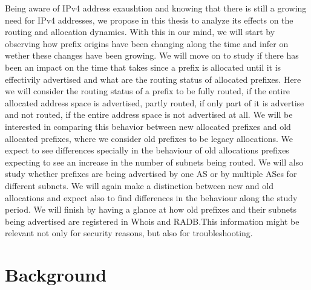 \documentclass[11pt,a4paper]{scrreprt}
\begin{document}
Being aware of IPv4 address exaushtion and knowing that there is still a growing need for IPv4 addresses, we propose in this thesis to analyze its effects on the routing and allocation dynamics. With this in our mind, we will start by observing how prefix origins have been changing along the time and infer on wether these changes have been growing. We will move on to study if there has been an impact on the time that takes since a prefix is allocated until it is effectivily advertised and what are the routing status of allocated prefixes. Here we will consider the routing status of a prefix to be fully routed, if the entire allocated address space is advertised, partly routed, if only part of it is advertise and not routed, if the entire address space is not advertised at all. We will be interested in comparing this behavior between new allocated prefixes and old allocated prefixes, where we consider old prefixes to be legacy allocations. We expect to see differences specially in the behaviour of old allocations prefixes expecting to see an increase in the number of subnets being routed. 
We will also study whether prefixes are being advertised by one AS or by multiple ASes for different subnets. We will again make a distinction between new and old allocations and expect also to find differences in the behaviour along the study period. We will finish by having a glance at how old prefixes and their subnets being advertised are registered in Whois and RADB.This information might be relevant not only for security reasons, but also for troubleshooting.   



\chapter{Background}
\end{document}
